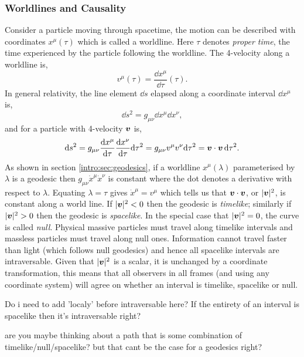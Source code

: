 \subsubsection{Worldlines and Causality}
Consider a particle moving through spacetime, the motion can be described with coordinates $x^\mu(\tau)$ which is called a worldline. Here $\tau$ denotes {\it proper time}, the time experienced by the particle following the worldline. The 4-velocity along a worldline is,
\begin{equation}
v^\mu(\tau) = \frac{\dd x^\mu}{\dd \tau}(\tau).
\end{equation}
In general relativity, the line element $\dd s$ elapsed along a coordinate interval $\dd x^\mu$ is,
\begin{equation}
\dd s ^2 = g_{\mu\nu}\dd x^\mu \dd x^\nu,
\end{equation}
and for a particle with 4-velocity $\boldsymbol{v}$ is,
\begin{equation}
\dd s ^2 = g_{\mu\nu} \frac{\dd x^\mu}{\dd \tau}  \frac{\dd x^\nu}{\dd \tau} \dd \tau^2 = g_{\mu\nu} v^\mu v^\nu \dd \tau^2 = \boldsymbol{v} \cdot \boldsymbol{v} \,\dd \tau^2.
\end{equation}
As shown in section \ref{intro:sec:geodesics}, if a worldline $x^\mu(\lambda)$ parameterised by $\lambda$ is a geodesic then $g_{\mu\nu} \dot{x}^\mu \dot{x}^\nu$ is constant where the dot denotes a derivative with respect to $\lambda$. Equating $\lambda=\tau$ gives $\dot{x}^\mu = v^\mu$ which tells us that $\boldsymbol{v} \cdot \boldsymbol{v}$, or $|\boldsymbol{v}|^2$, is constant along a world line. If $|\boldsymbol{v}|^2<0$ then the geodesic is {\it timelike}; similarly if $|\boldsymbol{v}|^2>0$ then the geodesic is {\it spacelike}. In the special case that $|\boldsymbol{v}|^2=0$, the curve is called {\it null}. Physical massive particles must travel along timelike intervals and massless particles must travel along null ones. Information cannot travel faster than light (which follows null geodesics) and hence all spacelike intervals are intraversable. Given that $|\boldsymbol{v}|^2$ is a scalar, it is unchanged by a coordinate transformation, this means that all observers in all frames (and using any coordinate system) will agree on whether an interval is timelike, spacelike or null.

\color{red} Do i need to add 'localy' before intraversable here? If the entirety of an interval is spacelike then it's intraversable right?

are you maybe thinking about a path that is some combination of timelike/null/spacelike? but that cant be the case for a geodesics right? \color{black}


